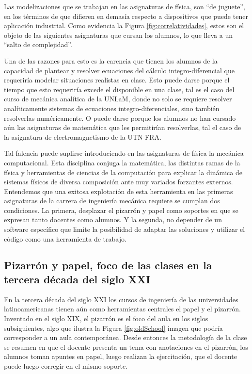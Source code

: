 \documentclass[a4paper]{fodami}        %
\begin{document}
Las modelizaciones que se trabajan en las asignaturas de física, son ``de juguete'', en los términos de que difieren en demasía respecto a dispositivos que puede tener aplicación industrial.
Como evidencia la Figura \ref{fig:correlatividades}, estos son el objeto de las siguientes asignaturas que cursan los alumnos, lo que lleva a un ``salto de complejidad''. %

Una de las razones para esto es la carencia que tienen los alumnos de la capacidad de plantear y resolver ecuaciones del cálculo integro-diferencial que requeriría modelar situaciones realistas en clase. 
Esto puede darse porque el tiempo que esto requeriría excede el disponible en una clase, tal es el caso del curso de mecánica analítica de la UNLaM, donde no solo se requiere resolver analíticamente sistemas de ecuaciones integro-diferenciales, sino también resolverlas numéricamente.
O puede darse porque los alumnos no han cursado aún las asignaturas de matemática que les permitirían resolverlas, tal el caso de la asignatura de electromagnetismo de la UTN FRA.

Tal falencia puede suplirse introduciendo en las asignaturas de física la mecánica computacional.
Esta disciplina conjuga la matemática, las distintas ramas de la física y herramientas de ciencias de la computación para explicar la dinámica de sistemas físicos de diversa composición ante muy variados forzantes externos.
Entendemos que una exitosa explotación de esta herramienta en las primeras asignaturas de la carrera de ingeniería mecánica requiere se cumplan dos condiciones.
La primera, desplazar el pizarrón y papel como soportes en que se expresan tanto docentes como alumnos.
Y la segunda, no depender de un software específico que limite la posibilidad de adaptar las soluciones y utilizar el código como una herramienta de trabajo. 



\subsection{Pizarrón y papel, foco de las clases en la tercera década del siglo XXI}	

En la tercera década del siglo XXI los cursos de ingeniería de las universidades latinoamericanas tienen aún como herramientas centrales el papel y el pizarrón.
Inventado en el siglo XIX, el pizarrón es el foco del aula en los siglos subsiguientes, algo que ilustra la Figura \ref{fig:oldSchool} imagen que podría corresponder a un aula contemporánea.
Desde entonces la metodología de la clase se resumen en que el docente presenta un tema con anotaciones en el pizarrón, los alumnos toman apuntes en papel, luego realizan la ejercitación, que el docente puede luego corregir en el mismo soporte.
\end{document}
